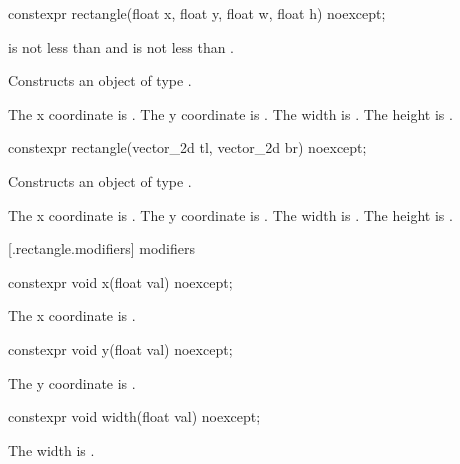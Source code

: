 %
\begin{itemdecl}
constexpr rectangle(float x, float y, float w, float h) noexcept;
\end{itemdecl}
\begin{itemdescr}
\pnum
\requires
{} is not less than  and  is not less than .

\pnum
\effects
Constructs an object of type .

\pnum
The x coordinate is . The y coordinate is . The width is . The height is .
\end{itemdescr}

%
\begin{itemdecl}
constexpr rectangle(vector_2d tl, vector_2d br) noexcept;
\end{itemdecl}
\begin{itemdescr}
\pnum
\effects
Constructs an object of type .

\pnum
The x coordinate is . The y coordinate is . The width is . The height is .
\end{itemdescr}

 [\iotwod.rectangle.modifiers]{ modifiers}

%
\begin{itemdecl}
constexpr void x(float val) noexcept;
\end{itemdecl}

\begin{itemdescr}
\pnum
\effects
The x coordinate is .
\end{itemdescr}

%
\begin{itemdecl}
constexpr void y(float val) noexcept;
\end{itemdecl}
\begin{itemdescr}
\pnum
\effects
The y coordinate is .
\end{itemdescr}

%
\begin{itemdecl}
constexpr void width(float val) noexcept;
\end{itemdecl}
\begin{itemdescr}
\pnum
\effects
The width is .
\end{itemdescr}

